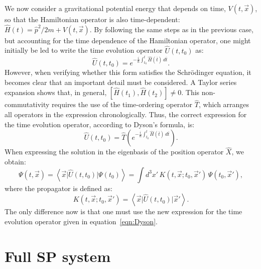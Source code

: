 \documentclass[12pt]{article}
\newcommand{\braket}[2]{\left< #1 | #2 \right>}
\begin{document}
We now consider a gravitational potential energy that depends on time, \( V(t,\vec{x}) \), so that the Hamiltonian operator is also time-dependent: \( \hat{H}(t) = \hat{p}^2/2m + V(t,\vec{x}) \). By following the same steps as in the previous case, but accounting for the time dependence of the Hamiltonian operator, one might initially be led to write the time evolution operator \( \hat{U}(t,t_0) \) as:
\begin{equation}
    \hat{U}(t,t_0) = e^{-\frac{i}{\hbar} \int_{t_0}^{t} \hat{H}(\overline{t})\, d\overline{t}}.
\end{equation}
However, when verifying whether this form satisfies the Schrödinger equation, it becomes clear that an important detail must be considered. A Taylor series expansion shows that, in general, \( [\hat{H}(t_1), \hat{H}(t_2)] \neq 0 \). This non-commutativity requires the use of the time-ordering operator \( \hat{T} \), which arranges all operators in the expression chronologically. Thus, the correct expression for the time evolution operator, according to Dyson's formula, is:
\begin{equation}
\label{eqn:Dyson}
    \hat{U}(t,t_0) = \hat{T} \left( e^{-\frac{i}{\hbar} \int_{t_0}^{t} \hat{H}(\overline{t})\, d\overline{t}} \right).
\end{equation}
When expressing the solution in the eigenbasis of the position operator \( \hat{X} \), we obtain:
\begin{equation}
\label{eqn:Sch_solformal}
    \Psi(t,\vec{x}) = \braket{\vec{x}}{\hat{U}(t,t_0) \big| \Psi(t_0)} = \int d^3 x' \, K(t,\vec{x}; t_0,\vec{x}') \, \Psi(t_0,\vec{x}'),
\end{equation}
where the propagator is defined as:
\begin{equation}
    K(t,\vec{x}; t_0,\vec{x}') = \braket{\vec{x}}{\hat{U}(t,t_0) \big| \vec{x}'}.
\end{equation}
The only difference now is that one must use the new expression for the time evolution operator given in equation~\eqref{eqn:Dyson}.

\section*{Full SP system}
\end{document}
